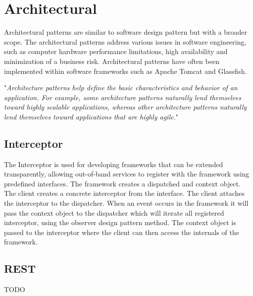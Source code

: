 \section{Architectural}
Architectural patterns are similar to software design pattern but with a broader scope. The architectural patterns address various issues in software engineering, such as computer hardware performance limitations, high availability and minimization of a business risk. Architectural patterns have often been implemented within software frameworks such as Apache Tomcat and Glassfish.

"\textit{Architecture patterns help define the basic characteristics and behavior of an application. For example, some architecture patterns naturally lend themselves toward highly scalable applications,
whereas other architecture patterns naturally lend themselves toward applications that are highly agile.}" \citep{patterns}

\subsection{Interceptor}
The Interceptor is used for developing frameworks that can be extended transparently, allowing out-of-band services to register with the framework using predefined interfaces. The framework creates  a dispatched and context object. The client creates a concrete interceptor from the interface. The client attaches the interceptor to the dispatcher. When an event occurs in the framework it will pass the context object to the dispatcher which will iterate all registered interceptor, using the observer design pattern method. The context object is passed to the interceptor where the client can then access the internals of the framework.

\subsection{REST}
TODO
